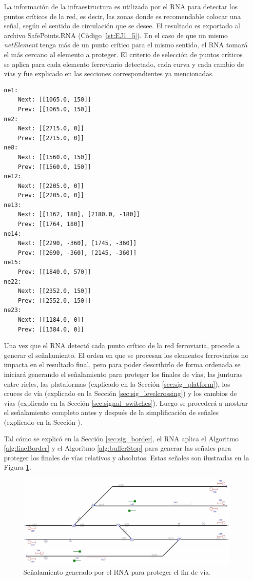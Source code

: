 	La información de la infraestructura es utilizada por el RNA para detectar los puntos críticos de la red, es decir, las zonas donde es recomendable colocar una señal, según el sentido de circulación que se desee. El resultado es exportado al archivo SafePoints.RNA (Código \ref{lst:EJ1_5}). En el caso de que un mismo \textit{netElement} tenga más de un punto crítico para el mismo sentido, el RNA tomará el más cercano al elemento a proteger. El criterio de selección de puntos críticos se aplica para cada elemento ferroviario detectado, cada curva y cada cambio de vías y fue explicado en las secciones correspondientes ya mencionadas.
	
	\begin{lstlisting}[language = {}, caption = SafePoints.RNA, label = {lst:EJ1_5}]
ne1:
	Next: [[1065.0, 150]]
	Prev: [[1065.0, 150]]
ne2:
	Next: [[2715.0, 0]]
	Prev: [[2715.0, 0]]
ne8:
	Next: [[1560.0, 150]]
	Prev: [[1560.0, 150]]
ne12:
	Next: [[2205.0, 0]]
	Prev: [[2205.0, 0]]
ne13:
	Next: [[1162, 180], [2180.0, -180]]
	Prev: [[1764, 180]]
ne14:
	Next: [[2290, -360], [1745, -360]]
	Prev: [[2690, -360], [2145, -360]]
ne15:
	Prev: [[1840.0, 570]]
ne22:
	Next: [[2352.0, 150]]
	Prev: [[2552.0, 150]]
ne23:
	Next: [[1184.0, 0]]
	Prev: [[1384.0, 0]]
	\end{lstlisting}
	
	Una vez que el RNA detectó cada punto crítico de la red ferroviaria, procede a generar el señalamiento. El orden en que se procesan los elementos ferroviarios no impacta en el resultado final, pero para poder describirlo de forma ordenada se iniciará generando el señalamiento para proteger los finales de vías, las junturas entre rieles, las plataformas (explicado en la Sección \ref{sec:sig_platform}), los cruces de vía (explicado en la Sección \ref{sec:sig_levelcrossing}) y los cambios de vías (explicado en la Sección \ref{sec:signal_switches}). Luego se procederá a mostrar el señalamiento completo antes y después de la simplificación de señales (explicado en la Sección \label{sec:simplificacion}). 
	
	Tal cómo se explicó en la Sección \ref{sec:sig_border}, el RNA aplica el Algoritmo \ref{alg:lineBorder} y el Algoritmo \ref{alg:bufferStop} para generar las señales para proteger los finales de vías relativos y absolutos. Estas señales son ilustradas en la Figura \ref{fig:EJ1_3}.
	
	\begin{figure}[H]
		\centering
		\includegraphics[width=1\textwidth]{resultados-obtenidos/ejemplo1/images/1_step1.png}
		\centering\caption{Señalamiento generado por el RNA para proteger el fin de vía.}
		\label{fig:EJ1_3}
	\end{figure}
	
